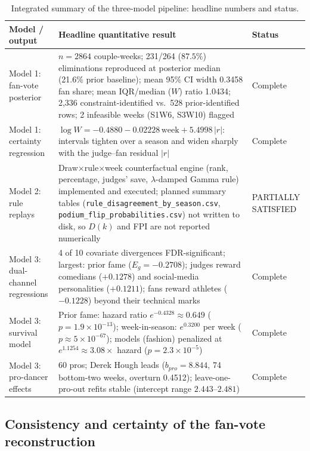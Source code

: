 \begin{table}[H]
\centering
\caption{Integrated summary of the three-model pipeline: headline numbers and status.}
\label{tab:integrated}
\small
\begin{tabular}{p{4.2cm}p{7.3cm}p{3.4cm}}
\toprule
Model / output & Headline quantitative result & Status\\
\midrule
Model 1: fan-vote posterior &
$n=2864$ couple-weeks; 231/264 ($87.5\%$) eliminations reproduced at posterior median
(21.6\% prior baseline); mean 95\% CI width 0.3458 fan share; mean IQR/median
($W$) ratio 1.0434; 2{,}336 constraint-identified vs.\ 528 prior-identified rows;
2 infeasible weeks (S1W6, S3W10) flagged &
Complete\\
\addlinespace
Model 1: certainty regression &
$\log W = -0.4880 - 0.02228\,\text{week} + 5.4998\,|r|$: intervals tighten over a
season and widen sharply with the judge--fan residual $|r|$ &
Complete\\
\addlinespace
Model 2: rule replays &
Draw$\times$rule$\times$week counterfactual engine (rank, percentage, judges' save,
$\lambda$-damped Gamma rule) implemented and executed; planned summary tables
(\texttt{rule\_disagreement\_by\_season.csv}, \texttt{podium\_flip\_probabilities.csv})
not written to disk, so $D(k)$ and FPI are not reported numerically &
PARTIALLY SATISFIED\\
\addlinespace
Model 3: dual-channel regressions &
4 of 10 covariate divergences FDR-significant; largest: prior fame
($E_g = -0.2708$); judges reward comedians ($+0.1278$) and social-media personalities
($+0.1211$); fans reward athletes ($-0.1228$) beyond their technical marks &
Complete\\
\addlinespace
Model 3: survival model &
Prior fame: hazard ratio $e^{-0.4328} \approx 0.649$ ($p = 1.9\times10^{-13}$);
week-in-season: $e^{0.3200}$ per week ($p \approx 5\times10^{-67}$); models (fashion)
penalized at $e^{1.1254} \approx 3.08\times$ hazard ($p = 2.3\times10^{-5}$) &
Complete\\
\addlinespace
Model 3: pro-dancer effects &
60 pros; Derek Hough leads ($b_{pro} = 8.844$, 74 bottom-two weeks, overturn 0.4512);
leave-one-pro-out refits stable (intercept range $2.443$--$2.481$) &
Complete\\
\bottomrule
\end{tabular}
\end{table}

\subsection{Consistency and certainty of the fan-vote reconstruction}

